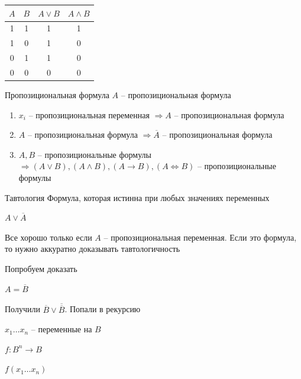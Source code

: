 \documentclass[12pt]{article}
\begin{document}
\begin{tabular}{cc|c|c}
    $A$ & $B$ & $A \lor B$ & $A \land B$ \\
    \hline
    1 & 1 & 1 & 1 \\
    1 & 0 & 1 & 0 \\
    0 & 1 & 1 & 0 \\
    0 & 0 & 0 & 0
\end{tabular}

\begin{defin}{Пропозициональная формула}
    $A$ -- пропозициональная формула

    \begin{enumerate}
        \item $x_i$ -- пропозициональная переменная $\Rightarrow A$ -- пропозициональная формула
        \item $A$ -- пропозициональная формула $\Rightarrow \overline{A}$ -- пропозициональная формула
        \item $A, B$ -- пропозициональные формулы $\Rightarrow (A \lor B), (A \land B), (A \rightarrow B), (A \Leftrightarrow B)$ -- пропозициональные формулы
    \end{enumerate}
\end{defin}

\begin{defin}{Тавтология}
    Формула, которая истинна при любых значениях переменных
\end{defin}

\begin{Example}{}
    $A \lor \overline{A}$ 
\end{Example}

\begin{Remark}{}
    Все хорошо только если $A$ -- пропозициональная переменная. Если это формула, то нужно аккуратно доказывать тавтологичность

    Попробуем доказать
\end{Remark}

\begin{Proof}{}

$A = \overline{B}$

Получили $\overline{B} \lor \overline{\overline{B}}$. Попали в рекурсию

\newpage

$x_1 \ldots x_n$ -- переменные на $B$

$f : B^n \to B$

$f(x_1 \ldots x_n)$

\end{Proof}
\end{document}

